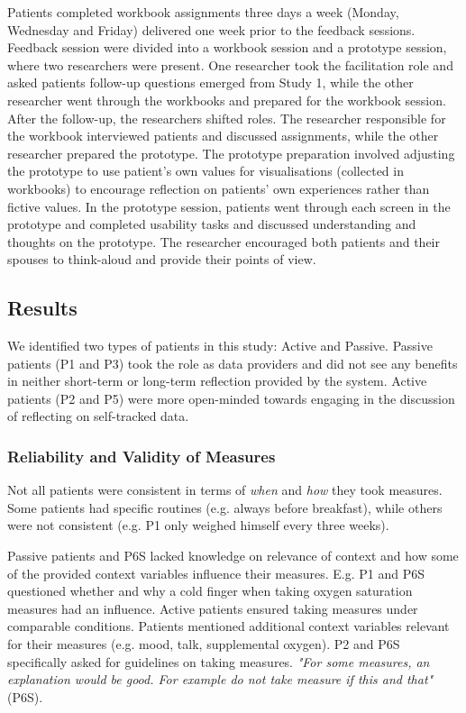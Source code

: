 Patients completed workbook assignments three days a week (Monday, Wednesday and Friday) delivered one week prior to the feedback sessions. Feedback session were divided into a workbook session and a prototype session, where two researchers were present. One researcher took the facilitation role and asked patients follow-up questions emerged from Study 1, while the other researcher went through the workbooks and prepared for the workbook session. After the follow-up, the researchers shifted roles. The researcher responsible for the workbook interviewed patients and discussed assignments, while the other researcher prepared the prototype. The prototype preparation involved adjusting the prototype to use patient's own values for visualisations (collected in workbooks) to encourage reflection on patients' own experiences rather than fictive values. In the prototype session, patients went through each screen in the prototype and completed usability tasks and discussed understanding and thoughts on the prototype. The researcher encouraged both patients and their spouses to think-aloud and provide their points of view. 

\subsection{Results}    
We identified two types of patients in this study: Active and Passive. Passive patients (P1 and P3) took the role as data providers and did not see any benefits in neither short-term or long-term reflection provided by the system. Active patients (P2 and P5) were more open-minded towards engaging in the discussion of reflecting on self-tracked data. 

\subsubsection{Reliability and Validity of Measures}
Not all patients were consistent in terms of \textit{when} and \textit{how} they took measures. Some patients had specific routines (e.g. always before breakfast), while others were not consistent (e.g. P1 only weighed himself every three weeks). 

Passive patients and P6S lacked knowledge on relevance of context and how some of the provided context variables influence their measures. E.g. P1 and P6S questioned whether and why a cold finger when taking oxygen saturation measures had an influence. Active patients ensured taking measures under comparable conditions. Patients mentioned additional context variables relevant for their measures (e.g. mood, talk, supplemental oxygen). P2 and P6S specifically asked for guidelines on taking measures. \textit{"For some measures, an explanation would be good. For example do not take measure if this and that"} (P6S).

